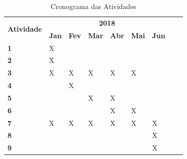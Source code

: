 \begin{table}[H]
\renewcommand{\arraystretch}{1.3}
\centering
\caption{Cronograma das Atividades}
\label{tab:cronograma}
\begin{tabular}{|l|l|l|l|l|l|l|l|l|}
\hline
\multicolumn{1}{|c|}{\multirow{2}{*}{\textbf{Atividade}}} & \multicolumn{6}{c|}{\textbf{2018}}         \\ \cline{2-7} 
\multicolumn{1}{|c|}{}                           & \textbf{Jan} & \textbf{Fev} & \textbf{Mar} & \textbf{Abr} & \textbf{Mai} & \textbf{Jun} \\ \hline
\textbf{1}                                                & X   &     &     &     &     &     \\ \hline
\textbf{2}                                                &  X   &    &     &     &     &     \\ \hline
\textbf{3}                                                &  X   &  X   & X    &    X& X    &     \\ \hline
\textbf{4}                                                &     &    X &     &     &     &     \\ \hline
\textbf{5}                                                &     &     &     X&  X   &     &     \\ \hline
\textbf{6}                                                &     &     &     &    X &    X &     \\ \hline
\textbf{7}                                                &   X  &   X  &X     &   X  & X    & X    \\ \hline
\textbf{8}                                                &     &     &     &     &     &     X\\ \hline
\textbf{9}                                                &     &     &     &     &     &     X\\ \hline
\end{tabular}
\end{table}
